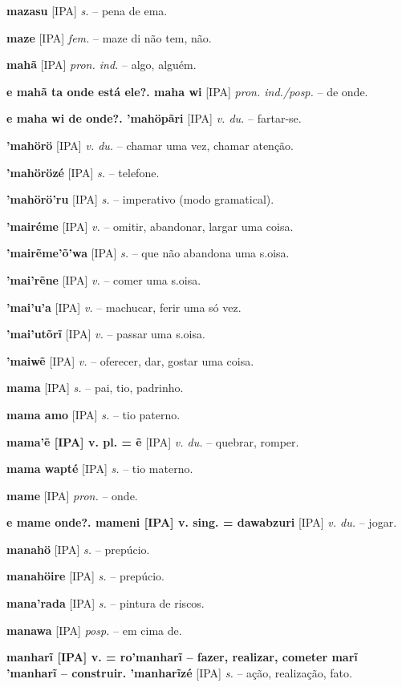 \textbf{mazasu} [IPA] \textit{s.} -- pena de ema.

\textbf{maze} [IPA] \textit{fem.} -- maze di não tem, não.

\textbf{mahã} [IPA] \textit{pron. ind.} -- algo, alguém.

\textbf{e mahã ta onde está ele?. maha wi} [IPA] \textit{pron. ind./posp.} -- de onde.

\textbf{e maha wi de onde?. 'mahöpãri} [IPA] \textit{v. du.} -- fartar-se.

\textbf{'mahörö} [IPA] \textit{v. du.} -- chamar uma vez, chamar atenção.

\textbf{'mahörözé} [IPA] \textit{s.} -- telefone.

\textbf{'mahörö'ru} [IPA] \textit{s.} -- imperativo (modo gramatical).

\textbf{'mairéme} [IPA] \textit{v.} -- omitir, abandonar, largar uma coisa.

\textbf{'mairẽme'õ'wa} [IPA] \textit{s.} -- que não abandona uma s.oisa.

\textbf{'mai'rẽne} [IPA] \textit{v.} -- comer uma s.oisa.

\textbf{'mai'u'a} [IPA] \textit{v.} -- machucar, ferir uma só vez.

\textbf{'mai'utõrĩ} [IPA] \textit{v.} -- passar uma s.oisa.

\textbf{'maiwẽ} [IPA] \textit{v.} -- oferecer, dar, gostar uma coisa.

\textbf{mama} [IPA] \textit{s.} -- pai, tio, padrinho.

\textbf{mama amo} [IPA] \textit{s.} -- tio paterno.

\textbf{mama'ẽ [IPA] v. pl. = ẽ} [IPA] \textit{v. du.} -- quebrar, romper.

\textbf{mama wapté} [IPA] \textit{s.} -- tio materno.

\textbf{mame} [IPA] \textit{pron.} -- onde.

\textbf{e mame onde?. mameni [IPA] v. sing. = dawabzuri} [IPA] \textit{v. du.} -- jogar.

\textbf{manahö} [IPA] \textit{s.} -- prepúcio.

\textbf{manahöire} [IPA] \textit{s.} -- prepúcio.

\textbf{mana'rada} [IPA] \textit{s.} -- pintura de riscos.

\textbf{manawa} [IPA] \textit{posp.} -- em cima de.

\textbf{manharĩ [IPA] v. = ro'manharĩ -- fazer, realizar, cometer  marĩ 'manharĩ -- construir. 'manharĩzé} [IPA] \textit{s.} -- ação, realização, fato.

